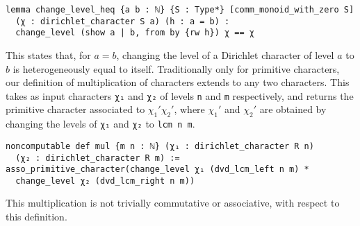 \documentclass[a4paper,UKenglish,cleveref, autoref, thm-restate,pdfa]{lipics-v2021}
\newcommand{\lean}[1]{\texttt{#1}\xspace} %
\begin{document}
\begin{lstlisting}
lemma change_level_heq {a b : ℕ} {S : Type*} [comm_monoid_with_zero S] 
  (χ : dirichlet_character S a) (h : a = b) : 
  change_level (show a | b, from by {rw h}) χ == χ
\end{lstlisting}
This states that, for $a = b$, changing the level of a Dirichlet character of level $a$ to $b$ is heterogeneously equal to itself. \newline
Traditionally only for primitive characters, our definition of multiplication of characters 
extends to any two characters. This takes as input characters \lean{χ₁} and \lean{χ₂} of levels \lean{n} and \lean{m} respectively, and returns the primitive 
character associated to $\chi_1' \chi_2'$, where $\chi_1'$ and $\chi_2'$ are obtained by changing the levels 
of \lean{χ₁} and \lean{χ₂} to \lean{lcm n m}. 
\begin{lstlisting}
noncomputable def mul {m n : ℕ} (χ₁ : dirichlet_character R n) 
  (χ₂ : dirichlet_character R m) :=
asso_primitive_character(change_level χ₁ (dvd_lcm_left n m) * 
  change_level χ₂ (dvd_lcm_right n m))
\end{lstlisting} 
This multiplication is not trivially commutative or associative, with respect to this definition. 
\end{document}
